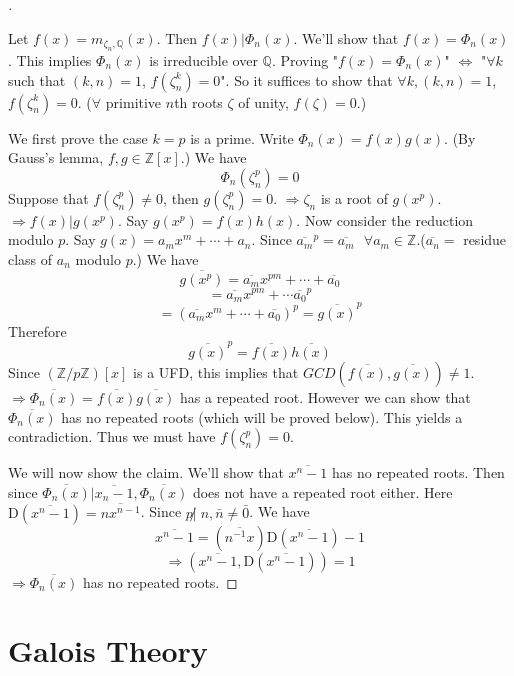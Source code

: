 \documentclass[12pt]{article}
\newcommand{\sfa}{\text{  } \forall}
\theoremstyle{definition}
\newenvironment{proofs}[1][\proofname]{%
  \begin{proof}[#1]$ $\par\nobreak\ignorespaces
}{%
  \end{proof}
}
\begin{document}
\begin{proofs}
	Let $f(x) = m_{\zeta_n, \mathbb{Q}}(x)$.
	Then $f(x) | \Phi_n(x)$.
	We'll show that $f(x) = \Phi_n(x)$.
	This implies $\Phi_n(x)$ is irreducible over $\mathbb{Q}$.
	Proving "$f(x) = \Phi_n(x)$" $\Leftrightarrow$ "$\forall k$ such that $(k, n) = 1$, $f(\zeta_n^k) = 0$".
	So it suffices to show that $\forall k, (k, n) = 1$, $f(\zeta_n^k) = 0$. ($\forall $ primitive $n$th roots $\zeta$ of unity, $f(\zeta) = 0$.)
	\par We first prove the case $k = p$ is a prime.
	Write $\Phi_n(x) = f(x) g(x)$. (By Gauss's lemma, $f, g \in \mathbb{Z}[x]$.)
	We have
	\[
		\Phi_n(\zeta_n^p) = 0
	\]
	Suppose that $f(\zeta_n^p) \neq 0$, then $g(\zeta_n^p) = 0$.
	$\Rightarrow \zeta_n$ is a root of $g(x^p)$.
	$\Rightarrow f(x) | g(x^p)$.
	Say $g(x^p) = f(x) h(x)$.
	Now consider the reduction modulo $p$.
	Say $g(x) = a_m x^m + \cdots + a_n$.
	Since $\overline{a_m}^p = \overline{a_m} \sfa a_m \in \mathbb{Z}$.($\overline{a_n} = $ residue class of $a_n$ modulo $p$.)
	We have
	\[
		\overline{g(x^p)} = \overline{a_m} x^{pm} + \cdots + \overline{a_0}
	\]
	\[
		= \overline{a_m} x^{pm} + \cdots \overline{a_0}^p
	\]
	\[
		= (\overline{a_m} x^m + \cdots + \overline{a_0})^p = \overline{g(x)}^p
	\]
	Therefore
	\[
		\overline{g(x)}^p = \overline{f(x)}\overline{h(x)}
	\]
	Since $(\mathbb{Z}/p \mathbb{Z})[x]$ is a UFD, this implies that $GCD(\overline{f(x)}, \overline{g(x)}) \neq 1$.
	$\Rightarrow \overline{\Phi_n(x)} = \overline{f(x)} \overline{g(x)}$ has a repeated root.
	However we can show that $\overline{\Phi_n(x)}$ has no repeated roots (which will be proved below).
	This yields a contradiction.
	Thus we must have $f(\zeta_n^p) = 0$.
	\par We will now show the claim.
	We'll show that $\overline{x^n - 1}$ has no repeated roots.
	Then since $\overline{\Phi_n(x)} | \overline{x_n - 1}, \overline{\Phi_n(x)}$ does not have a repeated root either.
	Here $\mathrm{D}(\overline{x^n - 1}) = \overline{n x^{n - 1}}$.
	Since $p \not| \; n, \bar{n} \neq \bar{0}$.
	We have
	\[
		\overline{x^n - 1} = (\overline{n^{-1}x}) \mathrm{D}(\overline{x^n - 1}) - 1
	\]
	\[
		\Rightarrow (\overline{x^n - 1}, \mathrm{D}(\overline{x^n - 1})) = 1
	\]
	$\Rightarrow \overline{\Phi_n(x)}$ has no repeated roots.
\end{proofs}

\clearpage
\section{Galois Theory}
\end{document}
